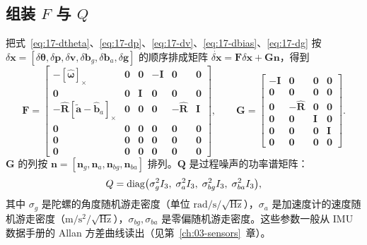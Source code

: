 \subsection{组装 $F$ 与 $Q$}

把式~\eqref{eq:17-dtheta}、\eqref{eq:17-dp}、\eqref{eq:17-dv}、\eqref{eq:17-dbias}、\eqref{eq:17-dg} 按 $\delta\bm{x}=[\delta\bm{\theta},\delta\bm{p},\delta\bm{v},\delta\bm{b}_g,\delta\bm{b}_a,\delta\bm{g}]$ 的顺序排成矩阵 $\dot{\delta\bm{x}}=\bm{F}\delta\bm{x}+\bm{G}\bm{n}$，得到
\begin{equation}\label{eq:17-F}
  \bm{F}=
  \begin{bmatrix}
    -[\hat{\bm{\omega}}]_\times & \bm{0} & \bm{0} & -\bm{I} & \bm{0} & \bm{0}\\
    \bm{0} & \bm{0} & \bm{I} & \bm{0} & \bm{0} & \bm{0}\\
    -\hat{\bm{R}}[\tilde{\bm{a}}-\hat{\bm{b}}_a]_\times & \bm{0} & \bm{0} & \bm{0} & -\hat{\bm{R}} & \bm{I}\\
    \bm{0} & \bm{0} & \bm{0} & \bm{0} & \bm{0} & \bm{0}\\
    \bm{0} & \bm{0} & \bm{0} & \bm{0} & \bm{0} & \bm{0}\\
    \bm{0} & \bm{0} & \bm{0} & \bm{0} & \bm{0} & \bm{0}
  \end{bmatrix},
  \qquad
  \bm{G}=
  \begin{bmatrix}
    -\bm{I} & \bm{0} & \bm{0} & \bm{0}\\
    \bm{0} & \bm{0} & \bm{0} & \bm{0}\\
    \bm{0} & -\hat{\bm{R}} & \bm{0} & \bm{0}\\
    \bm{0} & \bm{0} & \bm{I} & \bm{0}\\
    \bm{0} & \bm{0} & \bm{0} & \bm{I}\\
    \bm{0} & \bm{0} & \bm{0} & \bm{0}
  \end{bmatrix}.
\end{equation}
$\bm{G}$ 的列按 $\bm{n}=[\bm{n}_g,\bm{n}_a,\bm{n}_{bg},\bm{n}_{ba}]$ 排列。$\bm{Q}$ 是过程噪声的功率谱矩阵：
\begin{equation}\label{eq:17-Q}
  Q=\operatorname{diag}\bigl(\sigma_g^2I_3,\;\sigma_a^2I_3,\;\sigma_{bg}^2I_3,\;\sigma_{ba}^2I_3\bigr),
\end{equation}
其中 $\sigma_g$ 是陀螺的角度随机游走密度（单位 $\mathrm{rad/s/\sqrt{Hz}}$），$\sigma_a$ 是加速度计的速度随机游走密度（$\mathrm{m/s^2/\sqrt{Hz}}$），$\sigma_{bg},\sigma_{ba}$ 是零偏随机游走密度。这些参数一般从 IMU 数据手册的 Allan 方差曲线读出（见第~\ref{ch:03-sensors}~章）。

